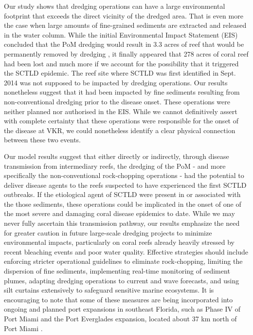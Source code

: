 \documentclass[preprint,12pt,authoryear]{elsarticle}
\begin{document}
Our study shows that dredging operations can have a large environmental footprint that exceeds the direct vicinity of the dredged area. That is even more the case when large amounts of fine-grained sediments are extracted and released in the water column. While the initial Environmental Impact Statement (EIS) concluded that the PoM dredging would result in 3.3 acres of reef that would be permanently removed by dredging \citep{USACE2004}, it finally appeared that 278 acres of coral reef had been lost \cite{noaa2023sedimentation} and much more if we account for the possibility that it triggered the SCTLD epidemic. The reef site where SCTLD was first identified in Sept. 2014 was not supposed to be impacted by dredging operations. Our results nonetheless suggest that it had been impacted by fine sediments resulting from non-conventional dredging prior to the disease onset. These operations were neither planned nor authorised in the EIS. While we cannot definitively assert with complete certainty that these operations were responsible for the onset of the disease at VKR, we could nonetheless identify a clear physical connection between these two events.

Our model results suggest that either directly or indirectly, through disease transmission from intermediary reefs, the dredging of the PoM - and more specifically the non-conventional rock-chopping operations - had the potential to deliver disease agents to the reefs suspected to have experienced the first SCTLD outbreaks. If the etiological agent of SCTLD were present in or associated with the those sediments, these operations could be implicated in the onset of one of the most severe and damaging coral disease epidemics to date. While we may never fully ascertain this transmission pathway, our results emphasize the need for greater caution in future large-scale dredging projects to minimize environmental impacts, particularly on coral reefs already heavily stressed by recent bleaching events and poor water quality. Effective strategies should include enforcing stricter operational guidelines to eliminate rock-chopping, limiting the dispersion of fine sediments, implementing real-time monitoring of sediment plumes, adapting dredging operations to current and wave forecasts, and using silt curtains extensively to safeguard sensitive marine ecosystems. It is encouraging to note that some of these measures are being incorporated into ongoing and planned port expansions in southeast Florida, such as Phase IV of Port Miami and the Port Everglades expansion, located about 37 km north of Port Miami \cite{noaa2023sedimentation}.
\end{document}
